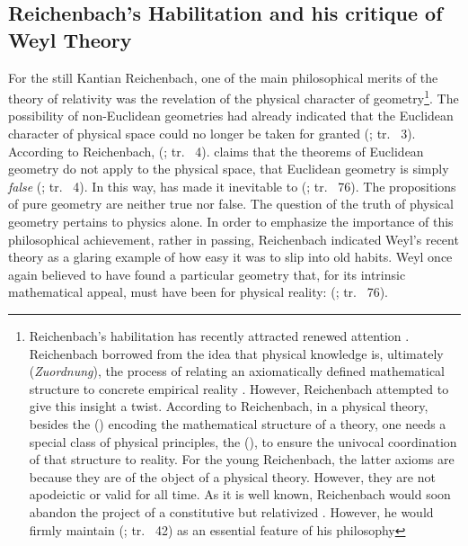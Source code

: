 \documentclass[final]{article}
\newcommand{\rhp}[2]{(\cite[#1]{Reichenbach1920a}; tr.\ \citeyear{Reichenbach1969} #2)\xspace}
\begin{document}
\subsection{Reichenbach's Habilitation and his critique of Weyl Theory}

For the still Kantian Reichenbach, one of the main philosophical merits of the theory of relativity was the revelation of the physical character of geometry\footnote{Reichenbach's habilitation has recently attracted renewed attention \citep{Friedman2001}. Reichenbach borrowed from \citet{Schlick1918} the idea that physical knowledge is, ultimately (\emph{Zuordnung}), the process of relating an axiomatically defined mathematical structure to concrete empirical reality \citep{Padovani2009}. However, Reichenbach attempted to give this insight a  twist. According to Reichenbach, in a physical theory, besides the  () encoding the mathematical structure of a theory, one needs a special class of physical principles, the  (), to ensure the univocal coordination of that structure to reality. For the young Reichenbach, the latter axioms are \apr because they are  of the object of a physical theory. However, they are not apodeictic or valid for all time. As it is well known, Reichenbach would soon abandon the project of a constitutive but relativized \apr. However, he would firmly maintain  \rhp{40}{42} as an essential feature of his philosophy}. The possibility of non-Euclidean geometries had already indicated that the Euclidean character of physical space could no longer be taken for granted \rhp{3}{3}. According to Reichenbach,  \rhp{3}{4}. \Rt claims that the theorems of Euclidean geometry do not apply to the physical space, that Euclidean geometry is simply \emph{false} \rhp{3}{4}. In this way, \rt has made it inevitable to  \rhp{73}{76}. The propositions of pure geometry are neither true nor false. The question of the truth of physical geometry pertains to physics alone. In order to emphasize the importance of this philosophical achievement, rather in passing, Reichenbach indicated Weyl's recent theory as a glaring example of how easy it was to slip into old habits. Weyl once again believed to have found a particular geometry that, for its intrinsic mathematical appeal, must have been  for physical reality:  \rhp{73}{76}.
\end{document}
